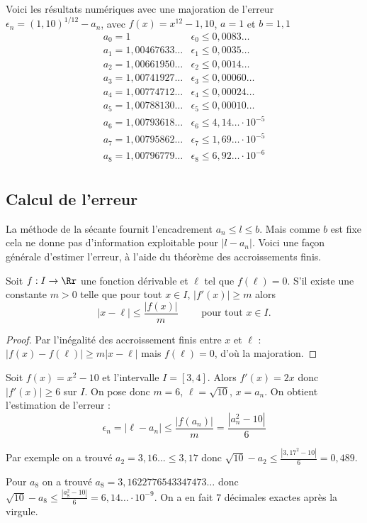 \documentclass[class=report,crop=false]{standalone}
\begin{document}
Voici les résultats numériques avec une majoration de l'erreur $\epsilon_n = (1,10)^{1/12}-a_n$,
avec $f(x) = x^{12} - 1,10$, $a=1$ et $b=1,1$
$$
\begin{array}{l|l}
  a_0 = 1                          & \epsilon_0 \le 0,0083\ldots \\
  a_1 = 1,00467633\ldots   & \epsilon_1 \le 0,0035\ldots \\
  a_2 = 1,00661950\ldots   & \epsilon_2 \le 0,0014\ldots \\
  a_3 = 1,00741927\ldots   & \epsilon_3 \le 0,00060\ldots \\
  a_4 = 1,00774712\ldots    & \epsilon_4 \le 0,00024\ldots \\
  a_5 = 1,00788130\ldots    & \epsilon_5 \le 0,00010\ldots\\
  a_6 = 1,00793618\ldots   & \epsilon_6 \le 4,14\ldots \cdot 10^{-5} \\
  a_7 = 1,00795862\ldots   & \epsilon_7 \le 1,69\ldots \cdot 10^{-5} \\
  a_8 = 1,00796779\ldots   & \epsilon_8 \le 6,92\ldots \cdot 10^{-6} \\
\end{array}
$$

\subsection{Calcul de l'erreur}

La méthode de la sécante fournit l'encadrement $a_n \le l \le b$.
Mais comme $b$ est fixe cela ne donne pas d'information exploitable pour $|l-a_n|$.
Voici une façon générale d'estimer l'erreur, à l'aide du théorème des accroissements finis.

\begin{proposition}
 Soit $f : I \to \Rr$ une fonction dérivable et $\ell$ tel que $f(\ell)=0$.
 S'il existe une constante $m>0$ telle que pour tout $x\in I$, $|f'(x)| \ge m$ alors
 $$|x-\ell| \le \frac{|f(x)|}{m} \qquad \text{ pour tout } x \in I.$$
\end{proposition}


\begin{proof}
  Par l'inégalité des accroissement finis entre $x$ et $\ell$ :
  $|f(x)-f(\ell)| \ge m |x-\ell|$
  mais $f(\ell)=0$, d'où la majoration.
\end{proof}

\begin{exemple}
Soit $f(x)=x^2-10$ et l'intervalle $I=[3,4]$. Alors
$f'(x)=2x$ donc $|f'(x)| \ge 6$ sur $I$.
On pose donc $m=6$, $\ell=\sqrt{10}$, $x=a_n$.
On obtient l'estimation de l'erreur :
$$\epsilon_n = |\ell-a_n| \le \frac{|f(a_n)|}{m} = \frac{|a_n^2 - 10|}{6}$$


Par exemple
on a trouvé $a_2 = 3,16... \le 3,17$
donc $\sqrt{10}-a_2 \le \frac{|3,17^2-10|}{6} = 0,489$.

Pour $a_8$ on a trouvé $a_8=3,1622776543347473\ldots$
donc $\sqrt{10}-a_8 \le \frac{|a_8^2-10|}{6} = 6,14\ldots \cdot 10^{-9}$. On a en fait $7$ décimales exactes après la virgule.
\end{exemple}
\end{document}
